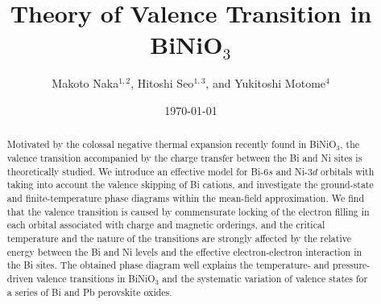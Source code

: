 \documentclass[aps,twocolumn,prl,showpacs,preprintnumbers,amsmath,amssymb]{revtex4}
\begin{document}
\title{Theory of Valence Transition in BiNiO$_3$}
\author{Makoto Naka$^{1,2}$, Hitoshi Seo$^{1,3}$, and Yukitoshi Motome$^4$}
\date{\today}
\begin{abstract} 
Motivated by the colossal negative thermal expansion recently found in BiNiO$_3$, the valence transition accompanied by the charge transfer between the Bi and Ni sites is theoretically studied. 
We introduce an effective model for Bi-$6s$ and Ni-$3d$ orbitals with taking into account the valence skipping of Bi cations, and investigate the ground-state and finite-temperature phase diagrams within the mean-field approximation. 
We find that the valence transition is caused by commensurate locking of the electron filling in each orbital associated with charge and magnetic orderings, and the critical temperature and the nature of the transitions are strongly affected by the relative energy between the Bi and Ni levels and the effective electron-electron interaction in the Bi sites. 
The obtained phase diagram well explains the temperature- and pressure-driven valence transitions in BiNiO$_3$ and the systematic variation of valence states for a series of Bi and Pb perovskite oxides. 
\end{abstract} 


\maketitle
\narrowtext



%
%

%

\end{document}
